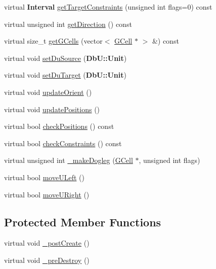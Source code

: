 \begin{DoxyCompactItemize}
\item 
virtual {\bf Interval} \hyperlink{classKatabatic_1_1AutoHorizontal_aaa70ba865e312fb30f81fa7f973a0376}{get\-Target\-Constraints} (unsigned int flags=0) const 
\item 
virtual unsigned int \hyperlink{classKatabatic_1_1AutoHorizontal_a09d03fbca9ab891c2f25bdae7f89a899}{get\-Direction} () const 
\item 
virtual size\-\_\-t \hyperlink{classKatabatic_1_1AutoHorizontal_ab681dca7dc930e06cacc2de85bf99166}{get\-G\-Cells} (vector$<$ \hyperlink{classKatabatic_1_1GCell}{G\-Cell} $\ast$ $>$ \&) const 
\item 
virtual void \hyperlink{classKatabatic_1_1AutoHorizontal_a756616a1967c5ad8efd08be96d18f25d}{set\-Du\-Source} ({\bf Db\-U\-::\-Unit})
\item 
virtual void \hyperlink{classKatabatic_1_1AutoHorizontal_a9df2ef68c1fbf4159cc837be5c699b53}{set\-Du\-Target} ({\bf Db\-U\-::\-Unit})
\item 
virtual void \hyperlink{classKatabatic_1_1AutoHorizontal_a59058f4593049c583c5b3698ff81b299}{update\-Orient} ()
\item 
virtual void \hyperlink{classKatabatic_1_1AutoHorizontal_a9662a77c2ed8553d6a0312c5292060ad}{update\-Positions} ()
\item 
virtual bool \hyperlink{classKatabatic_1_1AutoHorizontal_acfbdc94b1e84bd192087df53ead1f06f}{check\-Positions} () const 
\item 
virtual bool \hyperlink{classKatabatic_1_1AutoHorizontal_a46576c7c5c5146f8fa53a821b0766994}{check\-Constraints} () const 
\item 
virtual unsigned int \hyperlink{classKatabatic_1_1AutoHorizontal_a36c0eecad40d3559b5378caefec6a7e0}{\-\_\-make\-Dogleg} (\hyperlink{classKatabatic_1_1GCell}{G\-Cell} $\ast$, unsigned int flags)
\item 
virtual bool \hyperlink{classKatabatic_1_1AutoHorizontal_a1fa2421b74bf0eb934b7002fd3da2321}{move\-U\-Left} ()
\item 
virtual bool \hyperlink{classKatabatic_1_1AutoHorizontal_aa469e37853e31f8b1bc817518c896d62}{move\-U\-Right} ()
\end{DoxyCompactItemize}
\subsection*{Protected Member Functions}
\begin{DoxyCompactItemize}
\item 
virtual void \hyperlink{classKatabatic_1_1AutoHorizontal_a3715b38135ca24745f610bebd3407c10}{\-\_\-post\-Create} ()
\item 
virtual void \hyperlink{classKatabatic_1_1AutoHorizontal_a7c13d9795eafd477994961f8a0d962d0}{\-\_\-pre\-Destroy} ()
\end{DoxyCompactItemize}
